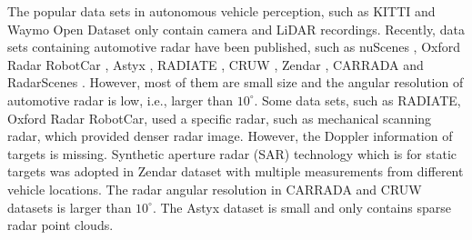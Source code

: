 \documentclass[conference]{IEEEtran}
\begin{document}
The popular data sets in autonomous vehicle perception, such as KITTI \cite{KITTI} and Waymo Open Dataset \cite{Waymo} only contain camera and LiDAR recordings. Recently, data sets containing automotive radar have been published, such as nuScenes \cite{nuScenes}, Oxford Radar RobotCar \cite{Oxford_radar_robotcar}, Astyx \cite{Astyx}, RADIATE \cite{RADIATE}, CRUW \cite{CRUW}, Zendar 
\cite{Zendar}, CARRADA \cite{CARRADA} and RadarScenes \cite{RadarScenes}. However, most of them are small size and  the angular resolution of automotive radar is low, i.e., larger than $10^\circ$. Some data sets, such as RADIATE, Oxford Radar RobotCar, used a specific radar, such as mechanical scanning radar, which provided denser radar image. However, the Doppler information of targets is missing. Synthetic aperture radar (SAR) technology which is for static targets was adopted in Zendar dataset with multiple measurements from different vehicle locations. The radar angular resolution in CARRADA and CRUW datasets is larger than $10^\circ$. The Astyx dataset is small and only contains sparse radar point clouds.

\begin{table}[h]
\centering
{}
\vspace{0mm}
\caption{Overview of publicly available radar data sets.}
\label{table_comparison_three_targets}
\vspace{-5mm}

\end{table}
\end{document}
